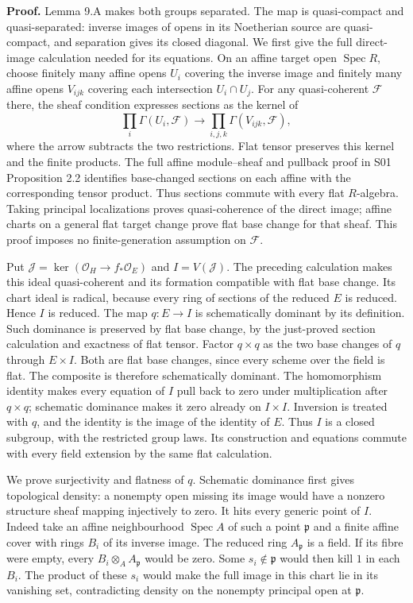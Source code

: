 \documentclass[11pt,a4paper,openany]{report}
\newcounter{none}
\begin{document}
\textbf{Proof.} Lemma 9.A makes both groups separated. The map is quasi-compact and quasi-separated: inverse images of opens in its Noetherian source are quasi-compact, and separation gives its closed diagonal. We first give the full direct-image calculation needed for its equations. On an affine target open \(\operatorname{Spec}R\), choose finitely many affine opens \(U_i\) covering the inverse image and finitely many affine opens \(V_{ijk}\) covering each intersection \(U_i\cap U_j\). For any quasi-coherent \(\mathcal F\) there, the sheaf condition expresses sections as the kernel of \[
 \prod_i\Gamma(U_i,\mathcal F)\longrightarrow
 \prod_{i,j,k}\Gamma(V_{ijk},\mathcal F),
\] where the arrow subtracts the two restrictions. Flat tensor preserves this kernel and the finite products. The full affine module--sheaf and pullback proof in S01 Proposition 2.2 identifies base-changed sections on each affine with the corresponding tensor product. Thus sections commute with every flat \(R\)-algebra. Taking principal localizations proves quasi-coherence of the direct image; affine charts on a general flat target change prove flat base change for that sheaf. This proof imposes no finite-generation assumption on \(\mathcal F\).

Put \(\mathcal J=\ker(\mathcal O_H\to f_*\mathcal O_E)\) and \(I=V(\mathcal J)\). The preceding calculation makes this ideal quasi-coherent and its formation compatible with flat base change. Its chart ideal is radical, because every ring of sections of the reduced \(E\) is reduced. Hence \(I\) is reduced. The map \(q:E\to I\) is schematically dominant by its definition. Such dominance is preserved by flat base change, by the just-proved section calculation and exactness of flat tensor. Factor \(q\times q\) as the two base changes of \(q\) through \(E\times I\). Both are flat base changes, since every scheme over the field is flat. The composite is therefore schematically dominant. The homomorphism identity makes every equation of \(I\) pull back to zero under multiplication after \(q\times q\); schematic dominance makes it zero already on \(I\times I\). Inversion is treated with \(q\), and the identity is the image of the identity of \(E\). Thus \(I\) is a closed subgroup, with the restricted group laws. Its construction and equations commute with every field extension by the same flat calculation.

We prove surjectivity and flatness of \(q\). Schematic dominance first gives topological density: a nonempty open missing its image would have a nonzero structure sheaf mapping injectively to zero. It hits every generic point of \(I\). Indeed take an affine neighbourhood \(\operatorname{Spec}A\) of such a point \(\mathfrak p\) and a finite affine cover with rings \(B_i\) of its inverse image. The reduced ring \(A_{\mathfrak p}\) is a field. If its fibre were empty, every \(B_i\otimes_AA_{\mathfrak p}\) would be zero. Some \(s_i\notin\mathfrak p\) would then kill \(1\) in each \(B_i\). The product of these \(s_i\) would make the full image in this chart lie in its vanishing set, contradicting density on the nonempty principal open at \(\mathfrak p\).
\end{document}
